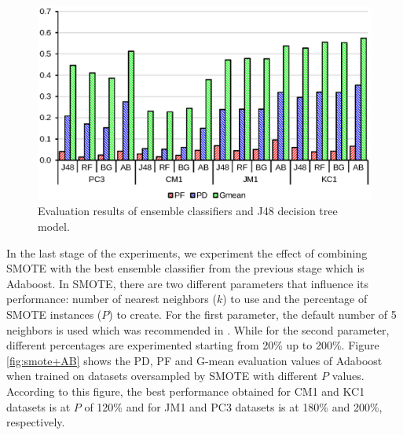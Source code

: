 \documentclass[runningheads,a4paper]{llncs}
\begin{document}
\begin{figure}[H]
\centering
\includegraphics[scale=0.6]{Ensembles.eps}
\caption{Evaluation results of ensemble classifiers and J48 decision tree model.}
\label{fig:ensembles}
\end{figure}


In the last stage of the experiments, we experiment the effect of combining SMOTE with the best ensemble classifier from the previous stage which is Adaboost. In SMOTE, there are two different parameters that influence its performance: number of nearest neighbors ($k$) to use and the percentage of SMOTE instances ($P$) to create. For the first parameter, the default number of 5 neighbors is used which was recommended in \cite{chawla2002smote}. While for the second parameter, different percentages are experimented starting from 20\% up to 200\%. Figure \ref{fig:smote+AB} shows the PD, PF and G-mean evaluation values of Adaboost when trained on datasets oversampled by SMOTE with different $P$ values. According to this figure, the best performance obtained for CM1 and KC1 datasets is at $P$ of 120\% and for JM1 and PC3 datasets is at 180\% and 200\%, respectively.


 
\end{document}
